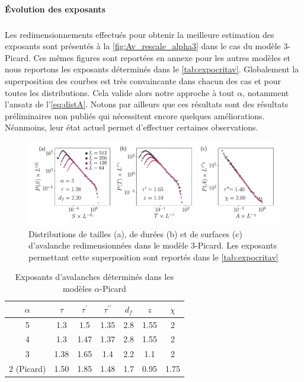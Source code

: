 \paragraph{\'Evolution des exposants}

\subparagraph{}Les redimensionnements effectués pour obtenir la meilleure estimation des exposants sont présentés à la \autoref{fig:Av_rescale_alpha3} dans le cas du modèle 3-Picard. Ces mêmes figures sont reportées en annexe pour les autres modèles et nous reportons les exposants déterminés dans le \autoref{tab:expocritav}. Globalement la superposition des courbes est très convaincante dans chacun des cas et pour toutes les distributions. Cela valide alors notre approche à tout $\alpha$, notamment l'ansatz de l'\autoref{eq:distA}. Notons par ailleurs que ces résultats sont des résultats préliminaires non publiés qui nécessitent encore quelques améliorations. Néanmoins, leur état actuel permet d'effectuer certaines observations.

\begin{figure}[h]
	\centering
	\includegraphics[width=\textwidth]{Chapitre4/Figures/Avalanches/Rescale_Av_alpha3.pdf}
	\caption{Distributions de tailles (a), de durées (b) et de surfaces (c) d'avalanche redimensionnées dans le modèle 3-Picard. Les exposants permettant cette superposition sont reportés dans le \autoref{tab:expocritav}}
	\label{fig:Av_rescale_alpha3}
\end{figure}

\begin{table}[h]
\centering
\begin{tabular}{ccccccc}
\hline \hline $\alpha$ & $\tau$ & \multicolumn{1}{c}{$\tau^\prime$} & $\tau^{\prime\prime}$ & $d_f$ & $z$ & $\chi$ \\
\hline 5 & 1.3 & 1.5 & 1.35 & 2.8 & 1.55 & 2 \\
4 & 1.3 & 1.47 & 1.37 & 2.8 & 1.55 & 2 \\
3 & 1.38 & 1.65 & 1.4 & 2.2 & 1.1 & 2 \\
2 (Picard) & 1.50 & 1.85 & 1.48 & 1.7 & 0.95 & 1.75 \\
\hline \hline
\end{tabular}
\caption{Exposants d'avalanches déterminés dans les modèles $\alpha$-Picard}
\label{tab:expocritav}
\end{table}

